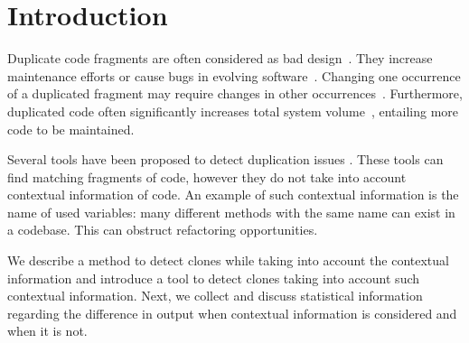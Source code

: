 \documentclass[conference]{IEEEtran}
\begin{document}
\section{Introduction}
Duplicate code fragments are often considered as bad design~\cite{fowler2018refactoring}. They increase maintenance efforts or cause bugs in evolving software~\cite{heitlager2007practical}. Changing one occurrence of a duplicated fragment may require changes in other occurrences~\cite{ostberg2014automatically}. Furthermore, duplicated code often significantly increases total system volume~\cite{svajlenko2019mutation}, entailing more code to be maintained.

Several tools have been proposed to detect duplication issues \cite{roy2009comparison, svajlenko2014evaluating, sheneamer2016survey}. These tools can find matching fragments of code, however they do not take into account contextual information of code. An example of such contextual information is the name of used variables: many different methods with the same name can exist in a codebase. This can obstruct refactoring opportunities.

We describe a method to detect clones while taking into account the contextual information and introduce a tool to detect clones taking into account such contextual information. Next, we collect and discuss statistical information regarding the difference in output when contextual information is considered and when it is not.
\end{document}
